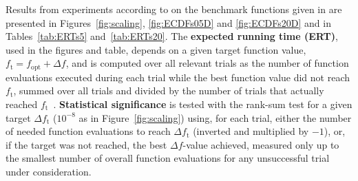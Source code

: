 \documentclass{sig-alternate}
\newcommand{\Df}{\ensuremath{\Delta f}}
\newcommand{\fopt}{\ensuremath{f_\mathrm{opt}}}
\newcommand{\ftarget}{\ensuremath{f_\mathrm{t}}}
\begin{document}
Results from experiments according to \cite{hansen2012exp} on the
benchmark functions given in \cite{wp200901_2010,hansen2012fun} are
presented in Figures~\ref{fig:scaling}, \ref{fig:ECDFs05D} and
\ref{fig:ECDFs20D} and in Tables~\ref{tab:ERTs5} and~\ref{tab:ERTs20}. The
\textbf{expected running time (ERT)}, used in the figures and table,
depends on a given target function value, $\ftarget=\fopt+\Df$, and is
computed over all relevant trials as the number of function
evaluations executed during each trial while the best function value
did not reach \ftarget, summed over all trials and divided by the
number of trials that actually reached \ftarget\
\cite{hansen2012exp,price1997dev}.  \textbf{Statistical significance}
is tested with the rank-sum test for a given target $\Delta\ftarget$
($10^{-8}$ as in Figure~\ref{fig:scaling}) using, for each trial,
either the number of needed function evaluations to reach
$\Delta\ftarget$ (inverted and multiplied by $-1$), or, if the target
was not reached, the best $\Df$-value achieved, measured only up to
the smallest number of overall function evaluations for any
unsuccessful trial under consideration.
\end{document}
